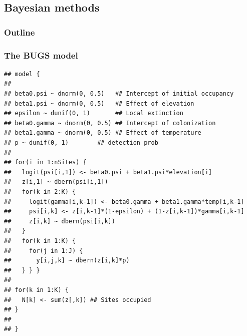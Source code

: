 \documentclass[color=usenames,dvipsnames]{beamer}\usepackage[]{graphicx}\usepackage[]{color}
\makeatletter
\newenvironment{kframe}{%
 \def\at@end@of@kframe{}%
 \ifinner\ifhmode%
  \def\at@end@of@kframe{\end{minipage}}%
  \begin{minipage}{\columnwidth}%
 \fi\fi%
 \def\FrameCommand##1{\hskip\@totalleftmargin \hskip-\fboxsep
 \colorbox{shadecolor}{##1}\hskip-\fboxsep
     \hskip-\linewidth \hskip-\@totalleftmargin \hskip\columnwidth}%
 \MakeFramed {\advance\hsize-\width
   \@totalleftmargin\z@ \linewidth\hsize
   \@setminipage}}%
 {\par\unskip\endMakeFramed%
 \at@end@of@kframe}
\newenvironment{knitrout}{}{} %
\makeatother
\begin{document}
\subsection{Bayesian methods}



\begin{frame}
  \frametitle{Outline}
  \Large
\end{frame}




\begin{frame}[fragile]
  \frametitle{The BUGS model}
\begin{knitrout}\tiny
{}\color{fgcolor}\begin{kframe}
\begin{verbatim}
## model {
## 
## beta0.psi ~ dnorm(0, 0.5)   ## Intercept of initial occupancy
## beta1.psi ~ dnorm(0, 0.5)   ## Effect of elevation
## epsilon ~ dunif(0, 1)       ## Local extinction
## beta0.gamma ~ dnorm(0, 0.5) ## Intercept of colonization
## beta1.gamma ~ dnorm(0, 0.5) ## Effect of temperature
## p ~ dunif(0, 1)        ## detection prob
## 
## for(i in 1:nSites) {
##   logit(psi[i,1]) <- beta0.psi + beta1.psi*elevation[i]
##   z[i,1] ~ dbern(psi[i,1])
##   for(k in 2:K) {
##     logit(gamma[i,k-1]) <- beta0.gamma + beta1.gamma*temp[i,k-1]
##     psi[i,k] <- z[i,k-1]*(1-epsilon) + (1-z[i,k-1])*gamma[i,k-1]
##     z[i,k] ~ dbern(psi[i,k])
##   }
##   for(k in 1:K) {
##     for(j in 1:J) {
##       y[i,j,k] ~ dbern(z[i,k]*p)
##   } } }
## 
## for(k in 1:K) {
##   N[k] <- sum(z[,k]) ## Sites occupied
## }
## 
## }
\end{verbatim}
\end{kframe}
\end{knitrout}
\end{frame}
\end{document}
